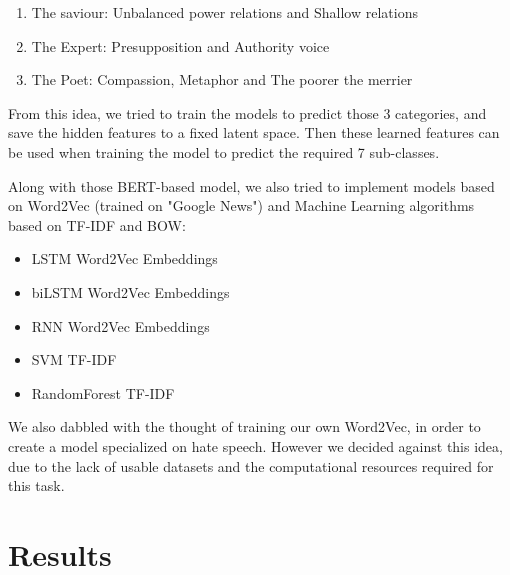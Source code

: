 \documentclass[11pt]{article}
\begin{document}
\begin{enumerate}
	      \begin{enumerate}
		      \item The saviour: Unbalanced power relations and Shallow relations

		      \item The Expert: Presupposition and Authority voice

		      \item The Poet: Compassion, Metaphor and The poorer the merrier

	      \end{enumerate}

	      From this idea, we tried to train the models to predict those 3
	      categories, and save the hidden features to a fixed latent space.
	      Then these learned features can be used when training the model to
	      predict the required 7 sub-classes.

	      Along with those BERT-based model, we also tried to implement models
	      based on Word2Vec \cite{mikolov2013word2vec} (trained on "Google News")
	      and Machine Learning algorithms based on TF-IDF and BOW:

	      \begin{itemize}
		      \item LSTM Word2Vec Embeddings \cite{staudemeyer2019understanding}
		      \item biLSTM Word2Vec Embeddings \cite{huang2015bidirectional}
		      \item RNN Word2Vec Embeddings \cite{rnn}
		      \item SVM TF-IDF
		      \item RandomForest TF-IDF
	      \end{itemize}

	      We also dabbled with the thought of training our own Word2Vec, in
	      order to create a model specialized on hate speech. However we
	      decided against this idea, due to the lack of usable datasets and the
	      computational resources required for this task.


\end{enumerate}


\section{Results}
\end{document}
